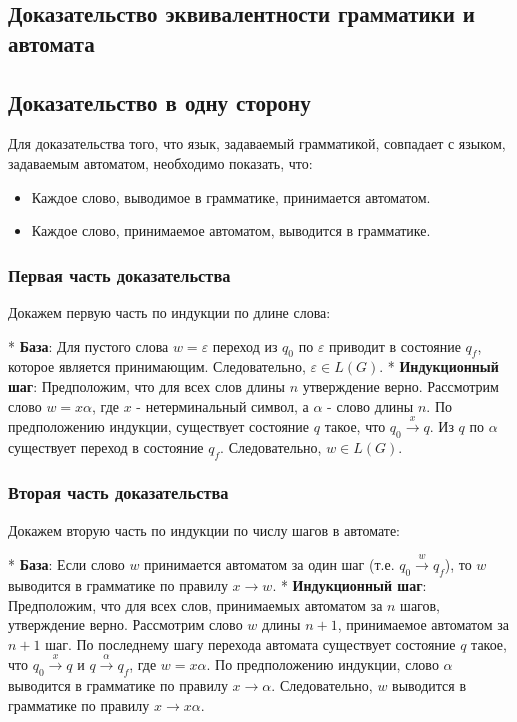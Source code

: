 \documentclass{article}
\begin{document}
\begin{itemize}
\begin{itemize}
\section{Доказательство эквивалентности грамматики и автомата}

\subsection{Доказательство в одну сторону}

Для доказательства того, что язык, задаваемый грамматикой, совпадает с языком, задаваемым автоматом, необходимо показать, что:

\begin{itemize}
    \item Каждое слово, выводимое в грамматике, принимается автоматом.
    \item Каждое слово, принимаемое автоматом, выводится в грамматике.
\end{itemize}

\subsubsection{Первая часть доказательства}

Докажем первую часть по индукции по длине слова:

* \textbf{База}: Для пустого слова $w=\varepsilon$ переход из $q_0$ по $\varepsilon$ приводит в состояние $q_f$, которое является принимающим. Следовательно, $\varepsilon\in L(G)$.
* \textbf{Индукционный шаг}: Предположим, что для всех слов длины $n$ утверждение верно. Рассмотрим слово $w=x\alpha$, где $x$ - нетерминальный символ, а $\alpha$ - слово длины $n$. По предположению индукции, существует состояние $q$ такое, что $q_0\xrightarrow{x}q$. Из $q$ по $\alpha$ существует переход в состояние $q_f$. Следовательно, $w\in L(G)$.

\subsubsection{Вторая часть доказательства}

Докажем вторую часть по индукции по числу шагов в автомате:

* \textbf{База}: Если слово $w$ принимается автоматом за один шаг (т.е. $q_0\xrightarrow{w}q_f$), то $w$ выводится в грамматике по правилу $x\rightarrow w$.
* \textbf{Индукционный шаг}: Предположим, что для всех слов, принимаемых автоматом за $n$ шагов, утверждение верно. Рассмотрим слово $w$ длины $n+1$, принимаемое автоматом за $n+1$ шаг. По последнему шагу перехода автомата существует состояние $q$ такое, что $q_0\xrightarrow{x}q$ и $q\xrightarrow{\alpha}q_f$, где $w=x\alpha$. По предположению индукции, слово $\alpha$ выводится в грамматике по правилу $x\rightarrow\alpha$. Следовательно, $w$ выводится в грамматике по правилу $x\rightarrow x\alpha$.


\end{itemize}
\end{itemize}
\end{document}
